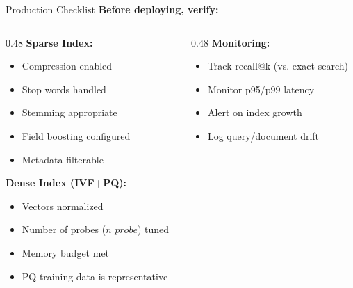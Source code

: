 \documentclass[aspectratio=169]{beamer}
\begin{document}
\begin{frame}[shrink=20]{Production Checklist}
\textbf{Before deploying, verify:}

\vspace{0.5em}

\begin{columns}
\begin{column}{0.48\textwidth}
\textbf{Sparse Index:}
\begin{itemize}
    \item[$\square$] Compression enabled
    \item[$\square$] Stop words handled
    \item[$\square$] Stemming appropriate
    \item[$\square$] Field boosting configured
    \item[$\square$] Metadata filterable
\end{itemize}

\vspace{0.5em}

\textbf{Dense Index (IVF+PQ):}
\begin{itemize}
    \item[$\square$] Vectors normalized
    \item[$\square$] Number of probes ($n\_probe$) tuned
    \item[$\square$] Memory budget met
    \item[$\square$] PQ training data is representative
\end{itemize}
\end{column}

\begin{column}{0.48\textwidth}
\textbf{Monitoring:}
\begin{itemize}
    \item[$\square$] Track recall@k (vs. exact search)
    \item[$\square$] Monitor p95/p99 latency
    \item[$\square$] Alert on index growth
    \item[$\square$] Log query/document drift
\end{itemize}
\end{column}
\end{columns}
\end{frame}
\end{document}
